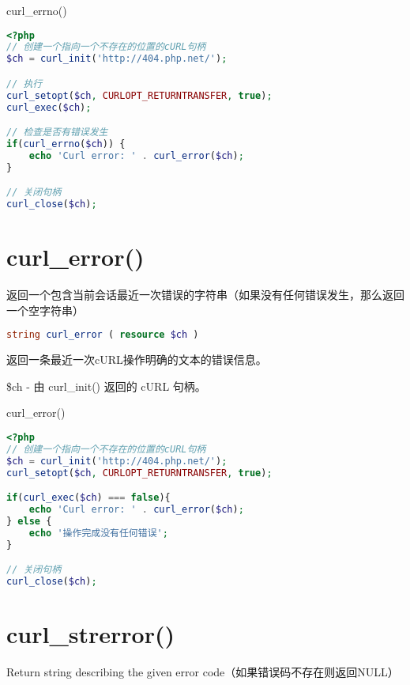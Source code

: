 \begin{example}
curl\_errno()
\begin{lstlisting}[language=PHP]
<?php
// 创建一个指向一个不存在的位置的cURL句柄
$ch = curl_init('http://404.php.net/');

// 执行
curl_setopt($ch, CURLOPT_RETURNTRANSFER, true);
curl_exec($ch);

// 检查是否有错误发生
if(curl_errno($ch)) {
    echo 'Curl error: ' . curl_error($ch);
}

// 关闭句柄
curl_close($ch);
\end{lstlisting}
\end{example}

\section{curl\_error()}

返回一个包含当前会话最近一次错误的字符串（如果没有任何错误发生，那么返回一个空字符串）

\begin{lstlisting}[language=PHP]
string curl_error ( resource $ch )
\end{lstlisting}

返回一条最近一次cURL操作明确的文本的错误信息。

\begin{compactitem}
\item \$ch - 由 curl\_init() 返回的 cURL 句柄。
\end{compactitem}





\begin{example}
curl\_error()
\begin{lstlisting}[language=PHP]
<?php
// 创建一个指向一个不存在的位置的cURL句柄
$ch = curl_init('http://404.php.net/');
curl_setopt($ch, CURLOPT_RETURNTRANSFER, true);

if(curl_exec($ch) === false){
    echo 'Curl error: ' . curl_error($ch);
} else {
    echo '操作完成没有任何错误';
}

// 关闭句柄
curl_close($ch);
\end{lstlisting}
\end{example}


\section{curl\_strerror()}

Return string describing the given error code（如果错误码不存在则返回NULL）


